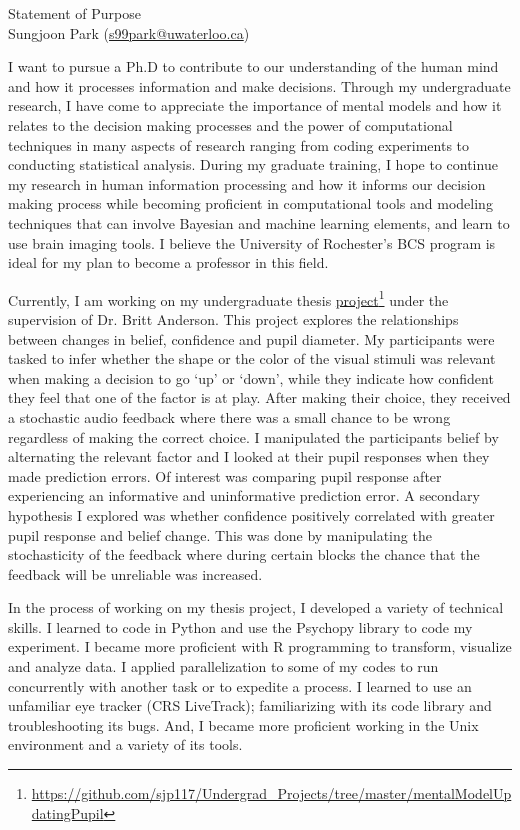 \documentclass[12pt]{article}
\let\oldcenter\center
\let\oldendcenter\endcenter
\renewenvironment{center}{\setlength\topsep{-1pt}\oldcenter}{\oldendcenter}
\begin{document}
	
	\begin{center}
		{\Large Statement of Purpose} \\
		{\normalsize Sungjoon Park (\href{mailto:s99park@uwaterloo.ca}{s99park@uwaterloo.ca})}
	\end{center}
	
	I want to pursue a Ph.D to contribute to our understanding of the human mind and how it processes information and make decisions. Through my undergraduate research, I have come to appreciate the importance of mental models and how it relates to the decision making processes and the power of computational techniques in many aspects of research ranging from coding experiments to conducting statistical analysis. During my graduate training, I hope to continue my research in human information processing and how it informs our decision making process while becoming proficient in computational tools and modeling techniques that can involve Bayesian and machine learning elements, and learn to use brain imaging tools. I believe the University of Rochester's BCS program is ideal for my plan to become a professor in this field.

	Currently, I am working on my undergraduate thesis \href{https://github.com/sjp117/Undergrad_Projects/tree/master/mentalModelUpdatingPupil}{project}\footnote{\url{https://github.com/sjp117/Undergrad\_Projects/tree/master/mentalModelUpdatingPupil}} under the supervision of Dr. Britt Anderson. This project explores the relationships between changes in belief, confidence and pupil diameter. My participants were tasked to infer whether the shape or the color of the visual stimuli was relevant when making a decision to go `up' or `down', while they indicate how confident they feel that one of the factor is at play. After making their choice, they received a stochastic audio feedback where there was a small chance to be wrong regardless of making the correct choice. I manipulated the participants belief by alternating the relevant factor and I looked at their pupil responses when they made prediction errors. Of interest was comparing pupil response after experiencing an informative and uninformative prediction error. A secondary hypothesis I explored was whether confidence positively correlated with greater pupil response and belief change. This was done by manipulating the stochasticity of the feedback where during certain blocks the chance that the feedback will be unreliable was increased.

	In the process of working on my thesis project, I developed a variety of technical skills. I learned to code in Python and use the Psychopy library to code my experiment. I became more proficient with R programming to transform, visualize and analyze data. I applied parallelization to some of my codes to run concurrently with another task or to expedite a process. I learned to use an unfamiliar eye tracker (CRS LiveTrack); familiarizing with its code library and troubleshooting its bugs. And, I became more proficient working in the Unix environment and a variety of its tools. 
\end{document}
